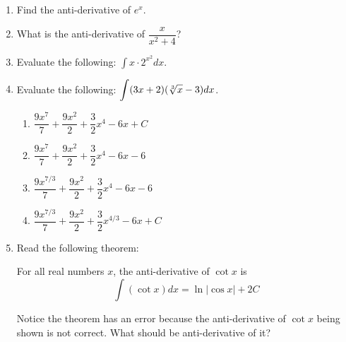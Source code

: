 \documentclass[10pt,paper=letter]{scrartcl}
\begin{document}
\begin{enumerate}[label=\arabic*.,font=\bfseries]
\item Find the anti-derivative of $\displaystyle{ e^{x}} $.


\item What is the anti-derivative of $\dfrac{x}{x^2 + 4}$?


\item Evaluate the following: $\displaystyle{\int x \cdot 2^{x^2} dx}$.


\item Evaluate the following: $\displaystyle{\int (3x+ 2)(\sqrt[3]{x} - 3) dx}$.

\begin{enumerate}
    \item[(a)]$\dfrac{9x^7}{7} + \dfrac{9x^2}{2} + \dfrac{3}{2}x^4 - 6x + C$
    \item[(b)]$\dfrac{9x^7}{7} + \dfrac{9x^2}{2} + \dfrac{3}{2}x^4 - 6x - 6$
    \item[(c)]$\dfrac{9x^{7/3}}{7} + \dfrac{9x^2}{2} + \dfrac{3}{2}x^4 - 6x - 6$
    \item[(d)]$\dfrac{9x^{7/3}}{7} + \dfrac{9x^2}{2} + \dfrac{3}{2}x^{4/3} - 6x + C$
\end{enumerate}

\item Read the following theorem:

\begin{mdframed}[style=jradduemmdbox, frametitle= \textbf{Theorem 3.1.} (Trigonometric Antiderivatives)] For all real numbers $x$, the anti-derivative of $\cot x$ is $$\int (\cot x) dx =  \ln |\cos x| + 2C$$

\end{mdframed}

Notice the theorem has an error because the anti-derivative of $\cot x$ being shown is not correct. What should be anti-derivative of it?


\end{enumerate}
\end{document}
